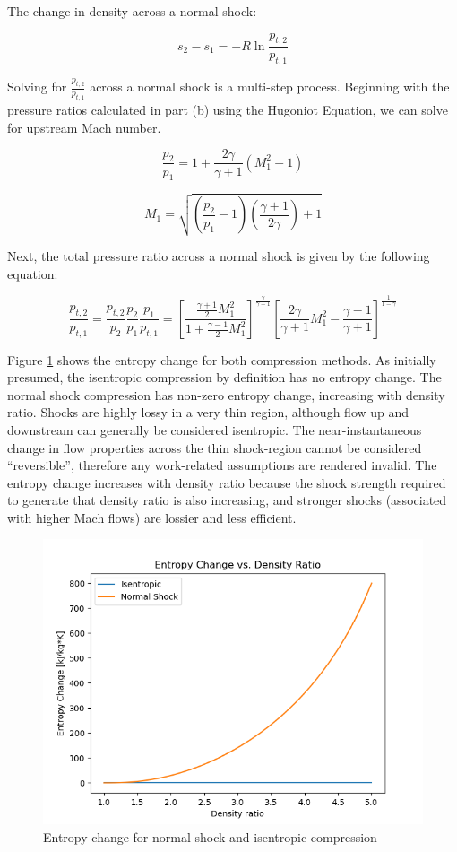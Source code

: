 \documentclass[../main.tex]{subfiles}
\begin{document}
The change in density across a normal shock:

\[
    s_2 - s_1 = -R \ln {\frac{p_{t,2}}{p_{t,1}}}
\]

Solving for \(\frac{p_{t,2}}{p_{t,1}}\) across a normal shock is a multi-step process.
Beginning with the pressure ratios calculated in part (b) using the Hugoniot Equation, we can solve for upstream Mach number.

\[
    \frac{p_2}{p_1} = 1 + \frac{2\gamma}{\gamma+1}\left(M_1^2-1\right)
\]

\[
    M_1 = \sqrt{\left({\frac{p_2}{p_1} - 1}\right)\left({\frac{\gamma+1}{2\gamma}}\right) + 1}
\]

Next, the total pressure ratio across a normal shock is given by the following equation:

\[
    \frac{p_{t,2}}{p_{t,1}} = 
    \frac{p_{t,2}}{p_2} \frac{p_2}{p_1} \frac{p_1}{p_{t,1}} =
    {\left[{
    \frac{\frac{\gamma+1}{2}M_1^2}
    {1 + \frac{\gamma-1}{2}M_1^2}
    }\right]}^ {\frac{\gamma}{\gamma-1}}
    \left[{
    \frac{2\gamma}{\gamma+1}M_1^2 - \frac{\gamma-1}{\gamma+1}
    }\right]^{\frac{1}{1-\gamma}}
\]

Figure \ref{entropy} shows the entropy change for both compression methods.
As initially presumed, the isentropic compression by definition has no entropy change.
The normal shock compression has non-zero entropy change, increasing with density ratio.
Shocks are highly lossy in a very thin region, although flow up and downstream can generally be considered isentropic.
The near-instantaneous change in flow properties across the thin shock-region cannot be considered ``reversible'', therefore any work-related assumptions are rendered invalid.
The entropy change increases with density ratio because the shock strength required to generate that density ratio is also increasing, and stronger shocks (associated with higher Mach flows) are lossier and less efficient.

\begin{figure}[h!]
    \centering
    \includegraphics{../../images/problem_1/entropy_change.png}
    \caption{Entropy change for normal-shock and isentropic compression}
    \label{entropy}
\end{figure}
\end{document}
